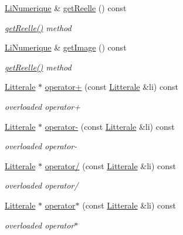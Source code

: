 \begin{DoxyCompactItemize}
\hyperlink{class_li_numerique}{Li\+Numerique} \& \hyperlink{class_li_complexe_abd5cae3001a94af1c18f7bb5092c9527}{get\+Reelle} () const 
\begin{DoxyCompactList}\small\item\em \hyperlink{class_li_complexe_abd5cae3001a94af1c18f7bb5092c9527}{get\+Reelle()} method \end{DoxyCompactList}\item 
\hyperlink{class_li_numerique}{Li\+Numerique} \& \hyperlink{class_li_complexe_ab0984cadf03a19e440dce8cea70b86e0}{get\+Image} () const 
\begin{DoxyCompactList}\small\item\em \hyperlink{class_li_complexe_abd5cae3001a94af1c18f7bb5092c9527}{get\+Reelle()} method \end{DoxyCompactList}\item 
\hyperlink{class_litterale}{Litterale} $\ast$ \hyperlink{class_li_complexe_a10fc45528f4f674e5afdddcd49cfefe8}{operator+} (const \hyperlink{class_litterale}{Litterale} \&li) const 
\begin{DoxyCompactList}\small\item\em overloaded operator+ \end{DoxyCompactList}\item 
\hyperlink{class_litterale}{Litterale} $\ast$ \hyperlink{class_li_complexe_aafe560e78d42938bce8e42672850f187}{operator-\/} (const \hyperlink{class_litterale}{Litterale} \&li) const 
\begin{DoxyCompactList}\small\item\em overloaded operator-\/ \end{DoxyCompactList}\item 
\hyperlink{class_litterale}{Litterale} $\ast$ \hyperlink{class_li_complexe_ab9dbace3f0fbd634a6258c4bcb5dc659}{operator/} (const \hyperlink{class_litterale}{Litterale} \&li) const 
\begin{DoxyCompactList}\small\item\em overloaded operator/ \end{DoxyCompactList}\item 
\hyperlink{class_litterale}{Litterale} $\ast$ \hyperlink{class_li_complexe_a88ad289cf55d8e6d89f0d77cf09d2ccf}{operator$\ast$} (const \hyperlink{class_litterale}{Litterale} \&li) const 
\begin{DoxyCompactList}\small\item\em overloaded operator$\ast$ \end{DoxyCompactList}\item 

\end{DoxyCompactItemize}
